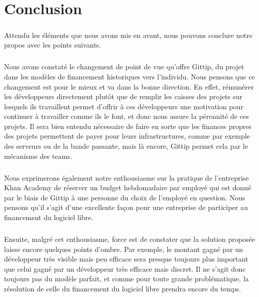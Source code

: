 \chapter*{Conclusion}



\paragraph{}
Attendu les éléments que nous avons mis en avant, nous pouvons conclure notre
propos avec les points suivants.

\paragraph{}
Nous avons constaté le changement de point de vue qu'offre Gittip, du projet
dans les modèles de financement historiques vers l'individu.
Nous pensons que ce changement est pour le mieux et va dans la bonne
direction.
En effet, rémunérer les développeurs directement plutôt que de remplir les
caisses des projets sur lesquels ils travaillent permet d'offrir à ces
développeurs une motivation pour continuer à travailler comme ils le font, et
donc nous assure la pérennité de ces projets.
Il sera bien entendu nécessaire de faire en sorte que les finances propres des
projets permettent de payer pour leurs infrastructures, comme par exemple des
serveurs ou de la bande passante, mais là encore, Gittip permet cela par le
mécanisme des teams.

\paragraph{}
Nous exprimerons également notre enthousiasme sur la pratique de l'entreprise
Khan Academy de réserver un budget hebdomadaire par employé qui est donné par
le biais de Gittip à une personne du choix de l'employé en question.
Nous pensons qu'il s'agit d'une excellente façon pour une entreprise de
participer au financement du logiciel libre.

\paragraph{}
Ensuite, malgré cet enthousiasme, force est de constater que la solution
proposée laisse encore quelques points d'ombre. Par exemple, le montant gagné
par un développeur très visible mais peu efficace sera presque toujours plus
important que celui gagné par un développeur très efficace mais discret.
Il ne s'agit donc toujours pas du modèle parfait, et comme pour toute grande
problématique, la résolution de celle du financement du logiciel libre prendra
encore du temps.

